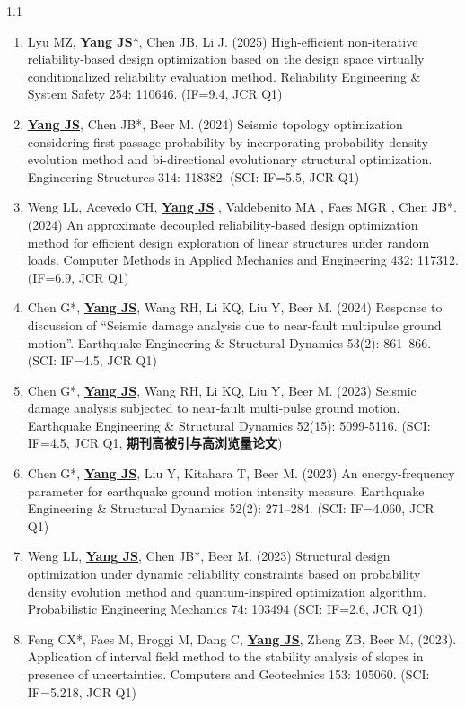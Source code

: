 \documentclass{resume}
\begin{document}
\begin{spacing}{1.1}
\begin{enumerate}[itemsep=5pt,topsep=2pt]
  \item Lyu MZ, \underline{\textbf{Yang JS}}*, Chen JB, Li J. (2025) High-efficient non-iterative reliability-based design optimization based on the design space virtually conditionalized reliability evaluation method. Reliability Engineering \& System Safety 254: 110646. (IF=9.4, JCR Q1)

  \item \underline{\textbf{Yang JS}}, Chen JB*, Beer M. (2024) Seismic topology optimization considering first-passage probability by incorporating probability density evolution method and bi-directional evolutionary structural optimization. Engineering Structures 314: 118382. (SCI: IF=5.5, JCR Q1)
  
  \item Weng LL, Acevedo CH, \underline{\textbf{Yang JS}} , Valdebenito MA , Faes MGR , Chen JB*. (2024) An approximate decoupled reliability-based design optimization method for efficient design exploration of linear structures under random loads. Computer Methods in Applied Mechanics and Engineering 432: 117312. (IF=6.9, JCR Q1)

  \item Chen G*, \underline{\textbf{Yang JS}}, Wang RH, Li KQ, Liu Y, Beer M. (2024) Response to discussion of “Seismic damage analysis due to near-fault multipulse ground motion”. Earthquake Engineering \& Structural Dynamics 53(2): 861–866. (SCI: IF=4.5, JCR Q1)

  \item Chen G*, \underline{\textbf{Yang JS}}, Wang RH, Li KQ, Liu Y, Beer M. (2023) Seismic damage analysis subjected to near-fault multi-pulse ground motion. Earthquake Engineering \& Structural Dynamics 52(15): 5099-5116. (SCI: IF=4.5, JCR Q1, \textbf{期刊高被引与高浏览量论文})

  \item Chen G*, \underline{\textbf{Yang JS}}, Liu Y, Kitahara T, Beer M. (2023) An energy-frequency parameter for earthquake ground motion intensity measure. Earthquake Engineering \& Structural Dynamics 52(2): 271–284. (SCI: IF=4.060, JCR Q1)

  \item Weng LL, \underline{\textbf{Yang JS}}, Chen JB*, Beer M. (2023) Structural design optimization under dynamic reliability constraints based on probability density evolution method and quantum-inspired optimization algorithm. Probabilistic Engineering Mechanics 74: 103494 (SCI: IF=2.6, JCR Q1)

  \item Feng CX*, Faes M, Broggi M, Dang C, \underline{\textbf{Yang JS}}, Zheng ZB, Beer M, (2023). Application of interval field method to the stability analysis of slopes in presence of uncertainties. Computers and Geotechnics 153: 105060. (SCI: IF=5.218, JCR Q1)


\end{enumerate}
\end{spacing}
\end{document}
